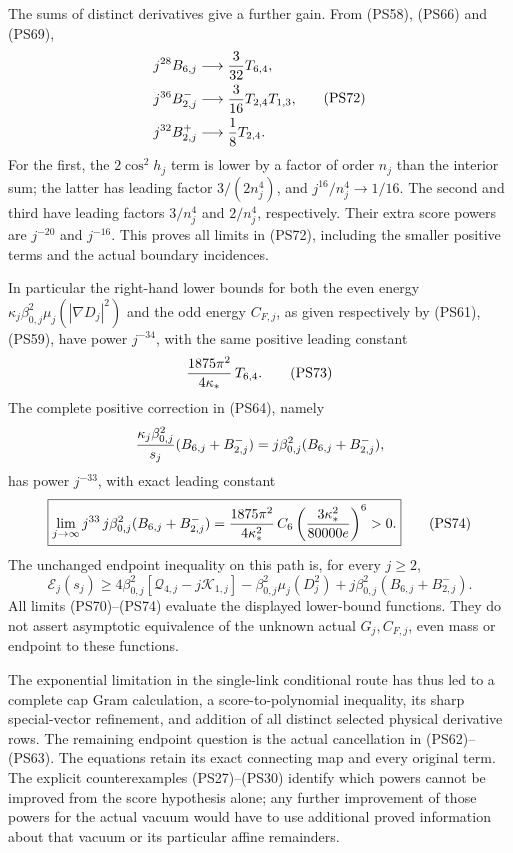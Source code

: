 \documentclass[11pt]{article}
\begin{document}
The sums of distinct derivatives give a further gain. From
(PS58), (PS66) and (PS69),
\[
 \begin{aligned}
 j^{28}B_{6,j}&\longrightarrow {3\over32}T_{6,4},\\
 j^{36}B_{2,j}^-&\longrightarrow {3\over16}T_{2,4}T_{1,3},\\
 j^{32}B_{2,j}^+&\longrightarrow {1\over8}T_{2,4}.
 \end{aligned}
 \tag{PS72}
\]
For the first, the \(2\cos^2h_j\) term is lower by a factor
of order \(n_j\) than the interior sum; the latter has leading
factor \(3/(2n_j^4)\), and \(j^{16}/n_j^4\to1/16\).
The second and third have leading factors \(3/n_j^4\) and
\(2/n_j^4\), respectively. Their extra score powers are
\(j^{-20}\) and \(j^{-16}\). This proves all limits in (PS72),
including the smaller positive terms and the actual boundary
incidences.

In particular the right-hand lower bounds for both the even
energy \(\kappa_j\beta_{0,j}^2\mu_j(|\nabla D_j|^2)\) and the
odd energy \(C_{F,j}\), as given respectively by (PS61), (PS59),
have power \(j^{-34}\), with the same positive leading constant
\[
 {1875\pi^2\over4\kappa_*}\,T_{6,4}.
 \tag{PS73}
\]
The complete positive correction in (PS64), namely
\[
 {\kappa_j\beta_{0,j}^2\over s_j}(B_{6,j}+B_{2,j}^-)
                 =j\beta_{0,j}^2(B_{6,j}+B_{2,j}^-),
 \]
has power \(j^{-33}\), with exact leading constant
\[
 \boxed{
 \lim_{j\to\infty}j^{33}\,
      j\beta_{0,j}^2(B_{6,j}+B_{2,j}^-)
 = {1875\pi^2\over4\kappa_*^2}\,
       C_6\left({3\kappa_*^2\over80000e}\right)^6>0.}
 \tag{PS74}
\]
The unchanged endpoint inequality on this path is, for every
\(j\ge2\),
\[
 \boxed{\mathscr E_j(s_j)\ge
 4\beta_{0,j}^2[\mathcal Q_{4,j}-j\mathcal K_{1,j}]
 -\beta_{0,j}^2\mu_j(D_j^2)
 +j\beta_{0,j}^2(B_{6,j}+B_{2,j}^-).}
 \tag{PS75}
\]
All limits (PS70)–(PS74) evaluate the displayed lower-bound
functions. They do not assert asymptotic equivalence of the
unknown actual \(G_j,C_{F,j}\), even mass or endpoint to these
functions.

The exponential limitation in the single-link conditional route
has thus led to a complete cap Gram calculation, a score-to-polynomial
inequality, its sharp special-vector refinement, and addition of
all distinct selected physical derivative rows. The remaining
endpoint question is the actual cancellation in (PS62)–(PS63).
The equations retain its exact connecting map and every original
term. The explicit counterexamples (PS27)–(PS30) identify which
powers cannot be improved from the score hypothesis alone; any
further improvement of those powers for the actual vacuum would
have to use additional proved information about that vacuum or
its particular affine remainders.
\end{document}
